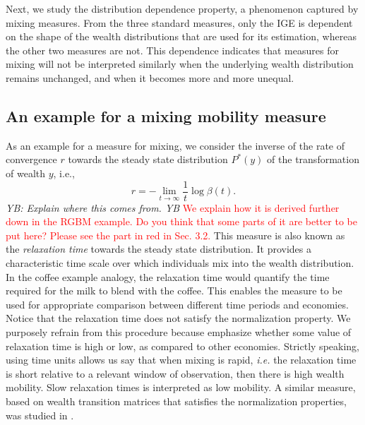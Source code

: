 \documentclass[11pt]{article}
\newcommand{\blue}[1]{{\color{blue} #1}}
\newcommand{\ie}{{\it i.e.}\xspace}
\newcommand{\YB}[1]{\blue{{\it YB: #1 YB}}}
\newcommand{\be}{\begin{equation}}
\newcommand{\ee}{\end{equation}}
\numberwithin{equation}{section}
\begin{document}
Next, we study the distribution dependence property, a phenomenon captured by mixing measures. From the three standard measures, only the IGE is dependent on the shape of the wealth distributions that are used for its estimation, whereas the other two measures are not. This dependence indicates that measures for mixing will not be interpreted similarly when the underlying wealth distribution remains unchanged, and when it becomes more and more unequal.



\subsection{An example for a mixing mobility measure}
\label{sec:relaxation-time}
As an example for a measure for mixing, we consider the inverse of the rate of convergence $r$ towards the steady state distribution $P^*(y)$ of the transformation of wealth $y$, i.e.,
%
\be
    r = - \lim_{t \to \infty} \frac{1}{t} \log \beta(t).
\ee
%
\YB{Explain where this comes from.} \textcolor{red}{We explain how it is derived further down in the RGBM example. Do you think that some parts of it are better to be put here? Please see the part in red in Sec. 3.2.}
This measure is also known as the \textit{relaxation time} towards the steady state distribution. It provides a characteristic time scale over which individuals mix into the wealth distribution. In the coffee example analogy, the relaxation time would quantify the time required for the milk to blend with the coffee. This enables the measure to be used for appropriate comparison between different time periods and economies. Notice that the relaxation time does not satisfy the normalization property. We purposely refrain from this procedure because emphasize whether some value of relaxation time is high or low, as compared to other economies. Strictly speaking, using time units allows us say that when mixing is rapid, \ie the relaxation time is short relative to a relevant window of observation, then there is high wealth mobility. Slow relaxation times is interpreted as low mobility. A similar measure, based on wealth transition matrices that satisfies the normalization properties, was studied in \citep{Shorrocks1978}.
\end{document}
